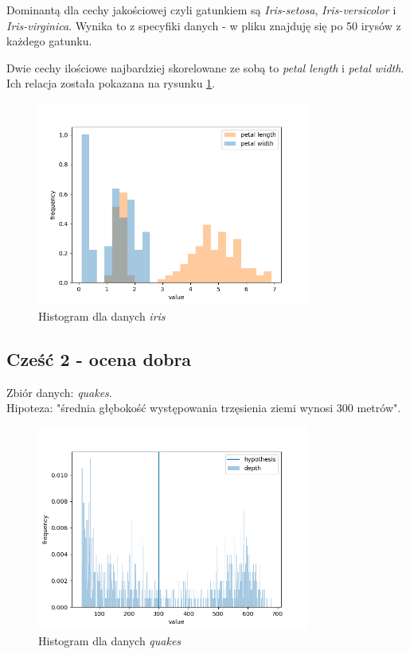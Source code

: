 \documentclass{classrep}
\begin{document}
Dominantą dla cechy jakościowej czyli gatunkiem są \textit{Iris-setosa}, \textit{Iris-versicolor} i \textit{Iris-virginica}. Wynika to z specyfiki danych - w pliku znajduję się po 50 irysów z każdego gatunku.

\vspace{1cm}

Dwie cechy ilościowe najbardziej skorelowane ze sobą to \textit{petal length} i \textit{petal width}. Ich relacja została pokazana na rysunku \ref{fig:hist3}.

\begin{figure}[H]
    	\centering
    	\includegraphics[width=0.8\textwidth]{images/histogram3.png}
    	\caption{Histogram dla danych \textit{iris}}
    	\label{fig:hist3}
\end{figure}

\subsection{Cześć 2 - ocena dobra} \label{sec:badania2}

Zbiór danych: \textit{quakes}.\\
Hipoteza: "średnia głębokość występowania trzęsienia ziemi wynosi 300 metrów".
\begin{figure}[H]
    	\centering
    	\includegraphics[width=0.8\textwidth]{images/histogram4.png}
    	\caption{Histogram dla danych \textit{quakes}}
    	\label{fig:hist4}
\end{figure}
\end{document}
